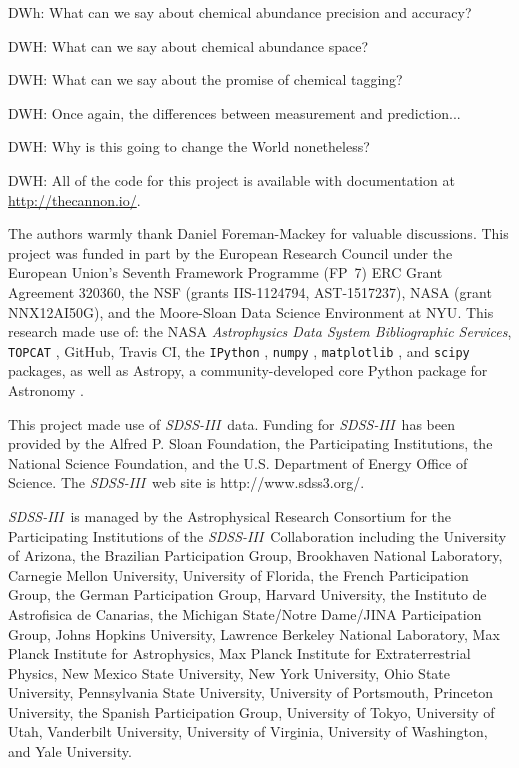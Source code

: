 \documentclass[12pt,preprint]{aastex}
\newcommand{\project}[1]{\textsl{#1}}
\newcommand{\acronym}[1]{{\small{#1}}}
\newcommand{\sdssiii}{\project{\acronym{SDSS-III}}}
\begin{document}
DWh: What can we say about chemical abundance precision and accuracy?

DWH: What can we say about chemical abundance space?

DWH: What can we say about the promise of chemical tagging?

DWH:  Once again, the differences between measurement and prediction...

DWH:  Why is this going to change the World nonetheless?

DWH: All of the code for this project is available with documentation
at \url{http://thecannon.io/}.





\acknowledgements
The authors warmly thank Daniel Foreman-Mackey for valuable discussions.
This project was funded in part by
  the European Research Council under the European Union's Seventh Framework 
  Programme (FP~7) \acronym{ERC} Grant Agreement 320360,
  the \acronym{NSF} (grants \acronym{IIS-1124794}, \acronym{AST-1517237}),
  \acronym{NASA} (grant \acronym{NNX12AI50G}), and 
  the Moore-Sloan Data Science Environment at \acronym{NYU}.
This research made use of: 
  the \acronym{NASA} \project{Astrophysics Data System Bibliographic Services},
  \texttt{TOPCAT} \citep{Taylor_2005},
  GitHub, 
  Travis CI, the
  \texttt{IPython} \citep{Perez_2007}, 
  \texttt{numpy} \citep{van_der_Walt_2011}, 
  \texttt{matplotlib} \citep{Hunter_2007}, and
  \texttt{scipy} \citep{Jones_2001} packages, as well as
  Astropy, a community-developed core Python package for Astronomy \citep{astropy}.


This project made use of \sdssiii\ data.
Funding for \sdssiii\ has been provided by the Alfred P. Sloan
Foundation, the Participating Institutions, the National Science
Foundation, and the \acronym{U.S.} Department of Energy Office of Science. The
\sdssiii\ web site is http://www.sdss3.org/.

\sdssiii\ is managed by the Astrophysical Research Consortium for the
Participating Institutions of the \sdssiii\ Collaboration including the
University of Arizona, the Brazilian Participation Group, Brookhaven
National Laboratory, Carnegie Mellon University, University of
Florida, the French Participation Group, the German Participation
Group, Harvard University, the Instituto de Astrofisica de Canarias,
the Michigan State/Notre Dame/\acronym{JINA} Participation Group, Johns Hopkins
University, Lawrence Berkeley National Laboratory, Max Planck
Institute for Astrophysics, Max Planck Institute for Extraterrestrial
Physics, New Mexico State University, New York University, Ohio State
University, Pennsylvania State University, University of Portsmouth,
Princeton University, the Spanish Participation Group, University of
Tokyo, University of Utah, Vanderbilt University, University of
Virginia, University of Washington, and Yale University.
\end{document}
